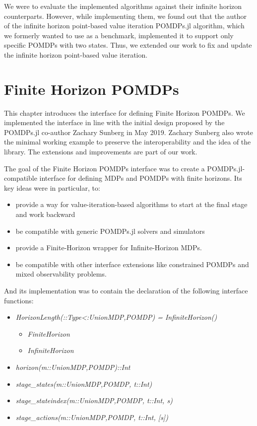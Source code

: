 We were to evaluate the implemented algorithms against their infinite horizon counterparts. However, while implementing them, we found out that the author of the infinite horizon point-based value iteration POMDPs.jl algorithm, which we formerly wanted to use as a benchmark, implemented it to support only specific POMDPs with two states. Thus, we extended our work to fix and update the infinite horizon point-based value iteration.


\section{Finite Horizon POMDPs}

This chapter introduces the interface for defining Finite Horizon POMDPs. We implemented the interface in line with the initial design proposed by the POMDPs.jl co-author Zachary Sunberg in May 2019. Zachary Sunberg also wrote the minimal working example to preserve the interoperability and the idea of the library. The extensions and improvements are part of our work.


The goal of the Finite Horizon POMDPs interface was to create a POMDPs.jl-compatible interface for defining MDPs and POMDPs with finite horizons. 
Its key ideas were in particular, to:
\begin{itemize}
    \item provide a way for value-iteration-based algorithms to start at the final stage and work backward
    \item be compatible with generic POMDPs.jl solvers and simulators
    \item provide a Finite-Horizon wrapper for Infinite-Horizon MDPs.
    \item be compatible with other interface extensions like constrained POMDPs and mixed observability problems.
\end{itemize}


And its implementation was to contain the declaration of the following interface functions:

\begin{itemize}
    \item \textit{HorizonLength(::Type{<:Union{MDP,POMDP}}) = InfiniteHorizon()}
    \begin{itemize}
        \item \textit{FiniteHorizon}
        \item \textit{InfiniteHorizon}
    \end{itemize}
    \item \textit{horizon(m::Union{MDP,POMDP})::Int}
    \item \textit{stage\_states(m::Union{MDP,POMDP}, t::Int)}
    \item \textit{stage\_stateindex(m::Union{MDP,POMDP}, t::Int, s)}
    \item \textit{stage\_actions(m::Union{MDP,POMDP}, t::Int, [s])}
\end{itemize}

